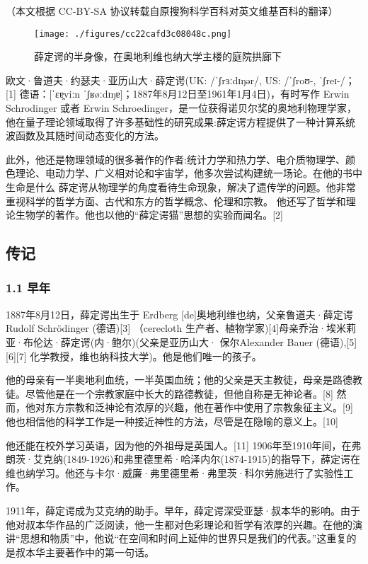 
（本文根据 CC-BY-SA 协议转载自原搜狗科学百科对英文维基百科的翻译）

\begin{figure}[ht]
\centering
\texttt{[image: ./figures/cc22cafd3c08048c.png]}
\caption{薛定谔的半身像，在奥地利维也纳大学主楼的庭院拱廊下} \label{fig_Erwin_4}
\end{figure}
欧文·鲁道夫·约瑟夫·亚历山大·薛定谔(UK: /ˈʃrɜːdɪŋər/, US: /ˈʃroʊ-, ˈʃreɪ-/；[1] 德语：[ˈɛɐ̯viːn ˈʃʁøːdɪŋɐ]；1887年8月12日至1961年1月4日)，有时写作 Erwin Schrodinger 或者 Erwin Schroedinger，是一位获得诺贝尔奖的奥地利物理学家，他在量子理论领域取得了许多基础性的研究成果:薛定谔方程提供了一种计算系统波函数及其随时间动态变化的方法。

此外，他还是物理领域的很多著作的作者:统计力学和热力学、电介质物理学、颜色理论、电动力学、广义相对论和宇宙学，他多次尝试构建统一场论。在他的书中生命是什么 薛定谔从物理学的角度看待生命现象，解决了遗传学的问题。他非常重视科学的哲学方面、古代和东方的哲学概念、伦理和宗教。 他还写了哲学和理论生物学的著作。他也以他的“薛定谔猫”思想的实验而闻名。[2]

\subsection{传记}
\subsubsection{1.1 早年}
1887年8月12日，薛定谔出生于 Erdberg [de]奥地利维也纳，父亲鲁道夫·薛定谔 Rudolf Schrödinger (德语)[3] （cerecloth 生产者、植物学家)[4]母亲乔治·埃米莉亚·布伦达·薛定谔(内·鲍尔)(父亲是亚历山大· 保尔Alexander Bauer (德语),[5][6][7] 化学教授，维也纳科技大学)。他是他们唯一的孩子。

他的母亲有一半奥地利血统，一半英国血统；他的父亲是天主教徒，母亲是路德教徒。尽管他是在一个宗教家庭中长大的路德教徒，但他自称是无神论者。[8] 然而，他对东方宗教和泛神论有浓厚的兴趣，他在著作中使用了宗教象征主义。[9] 他也相信他的科学工作是一种接近神性的方法，尽管是在隐喻的意义上。[10]

他还能在校外学习英语，因为他的外祖母是英国人。[11] 1906年至1910年间，在弗朗茨·艾克纳(1849-1926)和弗里德里希·哈泽内尔(1874-1915)的指导下，薛定谔在维也纳学习。他还与卡尔·威廉·弗里德里希·弗里茨·科尔劳施进行了实验性工作。

1911年，薛定谔成为艾克纳的助手。早年，薛定谔深受亚瑟·叔本华的影响。由于他对叔本华作品的广泛阅读，他一生都对色彩理论和哲学有浓厚的兴趣。在他的演讲“思想和物质”中，他说“在空间和时间上延伸的世界只是我们的代表。”这重复的是叔本华主要著作中的第一句话。

